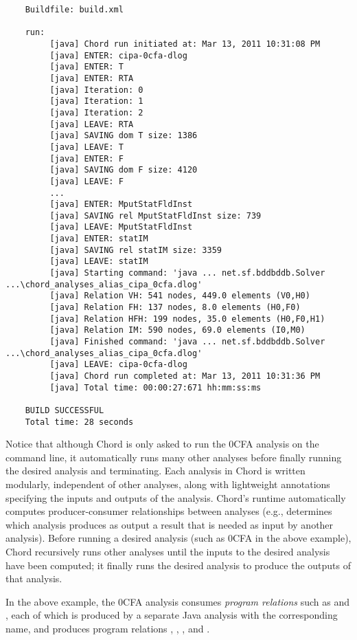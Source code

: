 \begin{verbatim}
    Buildfile: build.xml

    run:
         [java] Chord run initiated at: Mar 13, 2011 10:31:08 PM
         [java] ENTER: cipa-0cfa-dlog
         [java] ENTER: T
         [java] ENTER: RTA
         [java] Iteration: 0
         [java] Iteration: 1
         [java] Iteration: 2
         [java] LEAVE: RTA
         [java] SAVING dom T size: 1386
         [java] LEAVE: T
         [java] ENTER: F
         [java] SAVING dom F size: 4120
         [java] LEAVE: F
         ...
         [java] ENTER: MputStatFldInst
         [java] SAVING rel MputStatFldInst size: 739
         [java] LEAVE: MputStatFldInst
         [java] ENTER: statIM
         [java] SAVING rel statIM size: 3359
         [java] LEAVE: statIM
         [java] Starting command: 'java ... net.sf.bddbddb.Solver ...\chord_analyses_alias_cipa_0cfa.dlog'
         [java] Relation VH: 541 nodes, 449.0 elements (V0,H0)
         [java] Relation FH: 137 nodes, 8.0 elements (H0,F0)
         [java] Relation HFH: 199 nodes, 35.0 elements (H0,F0,H1)
         [java] Relation IM: 590 nodes, 69.0 elements (I0,M0)
         [java] Finished command: 'java ... net.sf.bddbddb.Solver ...\chord_analyses_alias_cipa_0cfa.dlog'
         [java] LEAVE: cipa-0cfa-dlog
         [java] Chord run completed at: Mar 13, 2011 10:31:36 PM
         [java] Total time: 00:00:27:671 hh:mm:ss:ms

    BUILD SUCCESSFUL
    Total time: 28 seconds
\end{verbatim}

Notice that although Chord is only asked to run the 0CFA analysis on the command line, it automatically
runs many other analyses before finally running the desired analysis and terminating.
Each analysis in Chord is written modularly, independent of other analyses, along with lightweight
annotations specifying the inputs and outputs of the analysis.  Chord's runtime automatically computes
producer-consumer relationships between analyses (e.g., determines which analysis produces as output a
result that is needed as input by another analysis).  Before running a desired analysis
(such as 0CFA in the above example), Chord recursively runs other analyses until the
inputs to the desired analysis have been computed; it finally runs the desired analysis to produce
the outputs of that analysis.

In the above example, the 0CFA analysis consumes {\it program relations} 
such as  and , each of which is produced by a separate Java analysis with the
corresponding name, and produces program relations , , , and .

